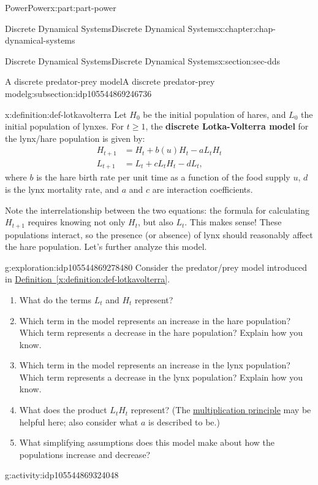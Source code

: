 \documentclass[oneside,10pt,]{book}
\newcommand{\xreffont}{\relax}
\newcommand{\terminology}[1]{\textbf{#1}}
\numberwithin{equation}{section}
\renewcommand{\ge}{\geqslant}
\newcommand{\amp}{&}
\begin{document}
\begin{partptx}{Power}{}{Power}{}{}{x:part:part-power}
\begin{chapterptx}{Discrete Dynamical Systems}{}{Discrete Dynamical Systems}{}{}{x:chapter:chap-dynamical-systems}
\begin{sectionptx}{Discrete Dynamical Systems}{}{Discrete Dynamical Systems}{}{}{x:section:sec-dds}
\begin{subsectionptx}{A discrete predator-prey model}{}{A discrete predator-prey model}{}{}{g:subsection:idp105544869246736}
%
\begin{definition}{}{x:definition:def-lotkavolterra}%
Let \(H_0\) be the initial population of hares, and \(L_0\) the initial population of lynxes. For \(t\ge 1\), the \terminology{discrete Lotka-Volterra model} for the lynx\slash{}hare population is given by:%
%
\begin{align*}
H_{t+1} \amp = H_t + b(u) H_t - a L_t H_t\\
L_{t+1} \amp = L_t + c L_t H_t - d L_t,
\end{align*}
where \(b\) is the hare birth rate per unit time as a function of the food supply \(u\), \(d\) is the lynx mortality rate, and \(a\) and \(c\) are interaction coefficients.%
\end{definition}
Note the interrelationship between the two equations: the formula for calculating \(H_{t+1}\) requires knowing not only \(H_t\), but also \(L_t\). This makes sense! These populations interact, so the presence (or absence) of lynx should reasonably affect the hare population. Let's further analyze this model.%
\begin{exploration}{}{g:exploration:idp105544869278480}%
Consider the predator\slash{}prey model introduced in \hyperref[x:definition:def-lotkavolterra]{Definition~{\xreffont\ref{x:definition:def-lotkavolterra}}}.%
%
\begin{enumerate}
\item{}What do the terms \(L_t\) and \(H_t\) represent?%
\item{}Which term in the model represents an increase in the hare population? Which term represents a decrease in the hare population? Explain how you know.%
\item{}Which term in the model represents an increase in the lynx population? Which term represents a decrease in the lynx population? Explain how you know.%
\item{}What does the product \(L_t H_t\) represent? (The \href{https://en.wikipedia.org/wiki/Rule_of_product}{multiplication principle}\footnotemark{} may be helpful here; also consider what \(a\) is described to be.)%
\item{}What simplifying assumptions does this model make about how the populations increase and decrease?%
\end{enumerate}
\end{exploration}%
%
\begin{activity}{}{g:activity:idp105544869324048}%

\end{activity}
\end{subsectionptx}
\end{sectionptx}
\end{chapterptx}
\end{partptx}
\end{document}
